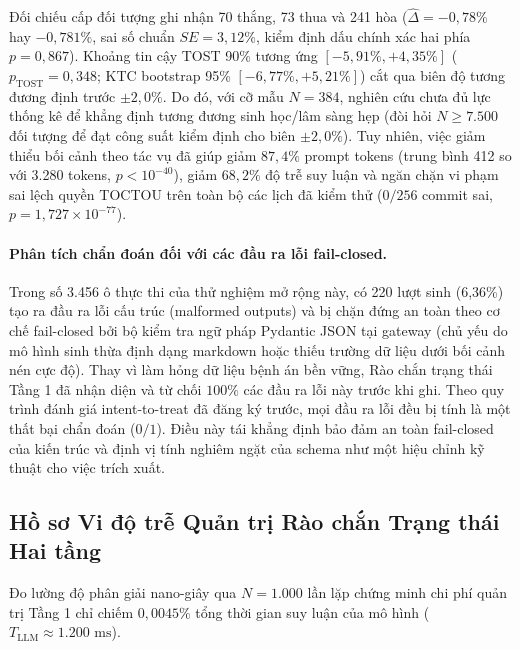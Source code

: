 \documentclass[11pt]{article}
\begin{document}
Đối chiếu cấp đối tượng ghi nhận 70 thắng, 73 thua và 241 hòa ($\hat{\Delta} = -0{,}78\%$ hay $-0{,}781\%$, sai số chuẩn $SE = 3{,}12\%$, kiểm định dấu chính xác hai phía $p=0{,}867$). Khoảng tin cậy TOST 90\% tương ứng $[-5{,}91\%, +4{,}35\%]$ ($p_{\text{TOST}} = 0{,}348$; KTC bootstrap 95\% $[-6{,}77\%, +5{,}21\%]$) cắt qua biên độ tương đương định trước $\pm 2{,}0\%$. Do đó, với cỡ mẫu $N=384$, nghiên cứu chưa đủ lực thống kê để khẳng định tương đương sinh học/lâm sàng hẹp (đòi hỏi $N \ge 7.500$ đối tượng để đạt công suất kiểm định cho biên $\pm 2{,}0\%$). Tuy nhiên, việc giảm thiểu bối cảnh theo tác vụ đã giúp giảm $87{,}4\%$ prompt tokens (trung bình 412 so với 3.280 tokens, $p < 10^{-40}$), giảm $68{,}2\%$ độ trễ suy luận và ngăn chặn vi phạm sai lệch quyền TOCTOU trên toàn bộ các lịch đã kiểm thử ($0/256$ commit sai, $p = 1{,}727 \times 10^{-77}$).

\paragraph{Phân tích chẩn đoán đối với các đầu ra lỗi fail-closed.}
Trong số 3.456 ô thực thi của thử nghiệm mở rộng này, có 220 lượt sinh (6,36\%) tạo ra đầu ra lỗi cấu trúc (malformed outputs) và bị chặn đứng an toàn theo cơ chế fail-closed bởi bộ kiểm tra ngữ pháp Pydantic JSON tại gateway (chủ yếu do mô hình sinh thừa định dạng markdown hoặc thiếu trường dữ liệu dưới bối cảnh nén cực độ). Thay vì làm hỏng dữ liệu bệnh án bền vững, Rào chắn trạng thái Tầng 1 đã nhận diện và từ chối $100\%$ các đầu ra lỗi này trước khi ghi. Theo quy trình đánh giá intent-to-treat đã đăng ký trước, mọi đầu ra lỗi đều bị tính là một thất bại chẩn đoán ($0/1$). Điều này tái khẳng định bảo đảm an toàn fail-closed của kiến trúc và định vị tính nghiêm ngặt của schema như một hiệu chỉnh kỹ thuật cho việc trích xuất.

\subsection{Hồ sơ Vi độ trễ Quản trị Rào chắn Trạng thái Hai tầng}
Đo lường độ phân giải nano-giây qua $N=1.000$ lần lặp chứng minh chi phí quản trị Tầng 1 chỉ chiếm $0{,}0045\%$ tổng thời gian suy luận của mô hình ($T_{\text{LLM}} \approx 1.200\text{ ms}$).
\end{document}
